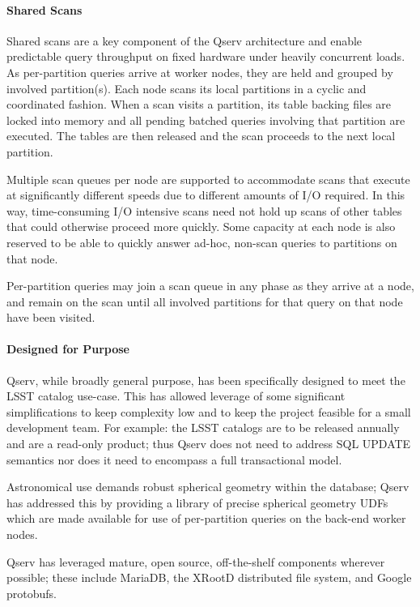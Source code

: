 \documentclass[11pt,twoside]{article}
\begin{document}
\paragraph{Shared Scans}

Shared scans are a key component of the Qserv architecture and enable predictable query throughput on fixed
hardware under heavily concurrent loads.  As per-partition queries arrive at worker nodes, they are held and
grouped by involved partition(s).  Each node scans its local partitions in a cyclic and coordinated fashion.
When a scan visits a partition, its table backing files are locked into memory and all pending batched queries
involving that partition are executed.  The tables are then released and the scan proceeds to the next local
partition.

Multiple scan queues per node are supported to accommodate scans that execute at significantly different
speeds due to different amounts of I/O required.  In this way, time-consuming I/O intensive scans need not
hold up scans of other tables that could otherwise proceed more quickly.  Some capacity at each node is also
reserved to be able to quickly answer ad-hoc, non-scan queries to partitions on that node.

Per-partition queries may join a scan queue in any phase as they arrive at a node, and remain on the scan until all
involved partitions for that query on that node have been visited.

\paragraph{Designed for Purpose}

Qserv, while broadly general purpose, has been specifically designed to meet the LSST catalog use-case. This
has allowed leverage of some significant simplifications to keep complexity low and to keep the project
feasible for a small development team.  For example: the LSST catalogs are to be released annually and are a
read-only product; thus Qserv does not need to address SQL UPDATE semantics nor does it need to encompass a
full transactional model.

Astronomical use demands robust spherical geometry within the database; Qserv has addressed this by providing
a library of precise spherical geometry UDFs which are made available for use of per-partition queries on the
back-end worker nodes.

Qserv has leveraged mature, open source, off-the-shelf components wherever possible; these include MariaDB,
the XRootD distributed file system, and Google protobufs.
\end{document}
